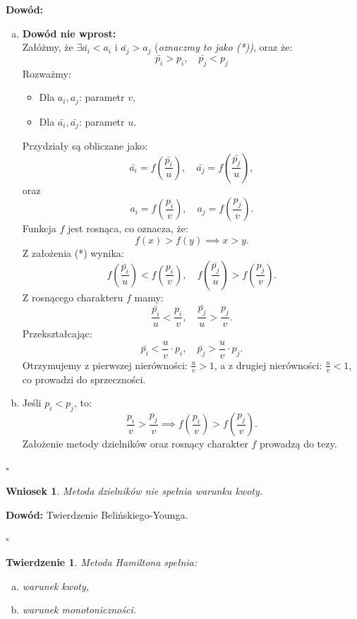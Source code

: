 \documentclass[12pt,a4paper]{article}
\theoremstyle{break}
\newtheorem{theorem}{Twierdzenie}[section]
\newtheorem{wniosek}{Wniosek}[theorem]
\begin{document}
	\noindent \textbf{Dowód:} 
	\begin{enumerate}[a)]
		\item \textbf{Dowód nie wprost:} \\
		Załóżmy, że $\exists \bar{a_i} < a_i$ i $\bar{a_j} > a_j$ (\textit{oznaczmy to jako (*))}, oraz że: 
		\[
		\bar{p_i} > p_i , \quad \bar{p_j} < p_j 
		\]
		Rozważmy:
		\begin{itemize}
			\item Dla $a_i, a_j$: parametr $v$,
			\item Dla $\bar{a_i}, \bar{a_j}$: parametr $u$.
		\end{itemize}
		Przydziały są obliczane jako:
		\[
		\bar{a_i} = f\left(\frac{\bar{p_i}}{u}\right), \quad \bar{a_j} = f\left(\frac{\bar{p_j}}{u}\right),
		\]
		oraz
		\[
		a_i = f\left(\frac{p_i}{v}\right), \quad a_j = f\left(\frac{p_j}{v}\right).
		\]
		Funkcja $f$ jest rosnąca, co oznacza, że:
		\[
		f(x) > f(y) \implies x > y.
		\]
		Z założenia (*) wynika:
		\[
		f\left(\frac{\bar{p_i}}{u}\right) < f\left(\frac{p_i}{v}\right), \quad f\left(\frac{\bar{p_j}}{u}\right) > f\left(\frac{p_j}{v}\right).
		\]
		Z rosnącego charakteru $f$ mamy:
		\[
		\frac{\bar{p_i}}{u} < \frac{p_i}{v}, \quad \frac{\bar{p_j}}{u} > \frac{p_j}{v}.
		\]
		Przekształcając:
		\[
		\bar{p_i} < \frac{u}{v} \cdot p_i, \quad \bar{p_j} > \frac{u}{v} \cdot p_j.
		\]
		Otrzymujemy z pierwszej nierówności: $\frac{u}{v} > 1$, a z drugiej nierówności: $\frac{u}{v} < 1$, co prowadzi do sprzeczności.
		
		\item Jeśli $p_i < p_j$, to:
		\[
		\frac{p_i}{v} > \frac{p_j}{v} \implies f\left(\frac{p_i}{v}\right) > f\left(\frac{p_j}{v}\right).
		\]
		Założenie metody dzielników oraz rosnący charakter $f$ prowadzą do tezy.
	\end{enumerate}
	\begin{flushright}
		$\square$
	\end{flushright}
	
	\begin{wniosek}
		Metoda dzielników nie spełnia warunku kwoty.
	\end{wniosek}
	
	\noindent \textbf{Dowód:} Twierdzenie Belińskiego-Younga.
	\begin{flushright}
		$\square$
	\end{flushright}
	
	\begin{theorem}
		Metoda Hamiltona spełnia:
		\begin{enumerate}[a)]
			\item warunek kwoty,
			\item warunek monotoniczności.
		\end{enumerate}
	\end{theorem}
	
\end{document}
